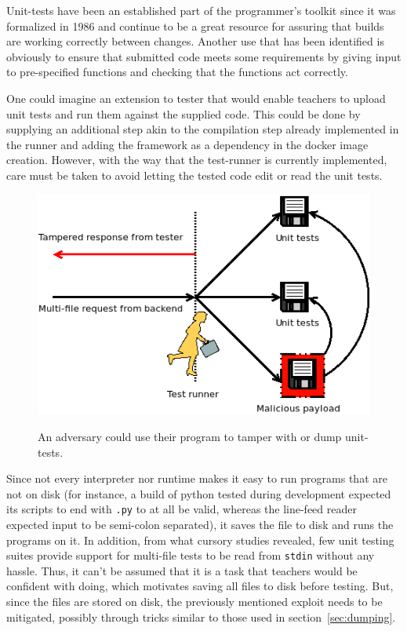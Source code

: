 \label{sec:unittests_future}
Unit-tests have been an established part of the programmer's toolkit since it was formalized in 1986\cite{1986ansi} and continue to be a great resource for assuring that builds are working correctly between changes. Another use that has been identified is obviously to ensure that submitted code meets some requirements by giving input to pre-specified functions and checking that the functions act correctly.

One could imagine an extension to tester that would enable teachers to upload unit tests and run them against the supplied code. This could be done by supplying an additional step akin to the compilation step already implemented in the runner and adding the framework as a dependency in the docker image creation. However, with the way that the test-runner is currently implemented, care must be taken to avoid letting the tested code edit or read the unit tests.
\begin{figure}[hb]
    \centering
    \includegraphics[width=.5\linewidth]{img/unittest_editing.png}\label{fig:unit_tamper}
    \caption{An adversary could use their program to tamper with or dump unit-tests.}
\end{figure}

Since not every interpreter nor runtime makes it easy to run programs that are not on disk (for instance, a build of python tested during development expected its scripts to end with \texttt{.py} to at all be valid, whereas the line-feed reader expected input to be semi-colon separated), it saves the file to disk and runs the programs on it. In addition, from what cursory studies revealed, few unit testing suites provide support for multi-file tests to be read from \texttt{stdin} without any hassle. Thus, it can't be assumed that it is a task that teachers would be confident with doing, which motivates saving all files to disk before testing. But, since the files are stored on disk, the previously mentioned exploit needs to be mitigated, possibly through tricks similar to those used in section~\ref{sec:dumping}.
